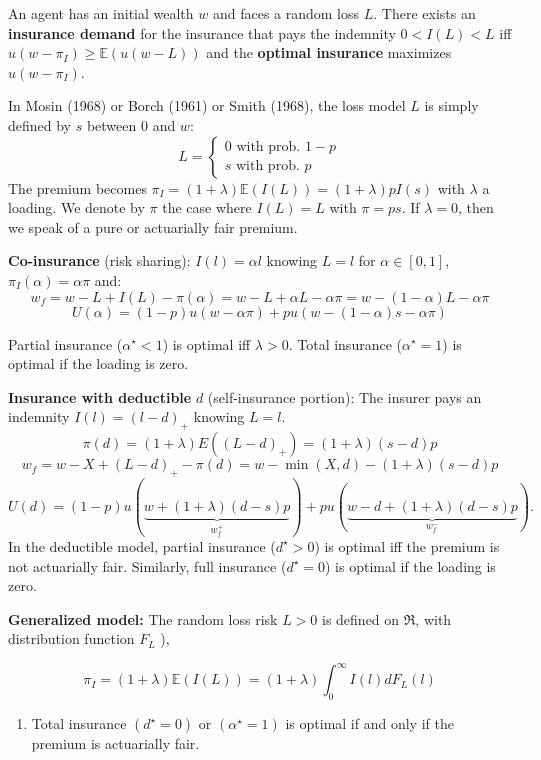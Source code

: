 \begin{f}
	
An agent has an initial wealth \(w\) and faces a random loss \(L\). There exists an \textbf{insurance demand} for the insurance that pays the indemnity \(0<I(L)<L\) iff \(u(w-\pi_I) \geq \mathbb{E}(u(w-L))\) and the \textbf{optimal insurance} maximizes \(u(w-\pi_I)\).

In Mosin (1968) or Borch (1961) or Smith (1968), the loss model \(L\) is simply defined by \(s\) between 0 and \(w\):
	\[
	L=\left\{\begin{array}{l}
		0 \text { with prob. } 1-p \\
		s \text { with prob. } p
	\end{array}\right.
	\]
The premium becomes \(\pi_I=(1+\lambda) \mathbb{E}(I(L))=(1+\lambda) p I(s)\) with \(\lambda\) a loading. We denote by \(\pi\) the case where \(I(L)=L\) with \(\pi= p s\). If \(\lambda=0\), then we speak of a pure or actuarially fair premium.
\medskip

\textbf{Co-insurance} (risk sharing):
\(I(l)=\alpha l\) knowing \(L=l\) for \(\alpha \in[0,1]\), \(\pi_I(\alpha)=\alpha \pi\) and:
\[
w_{f}=w-L+I(L)-\pi(\alpha)=w-L+\alpha L-\alpha \pi=w-(1-\alpha) L-\alpha \pi
\]
\[
U(\alpha)%
=(1-p) u(w-\alpha \pi)+p u(w-(1-\alpha) s-\alpha \pi)
\]

Partial insurance (\(\alpha^{\star}<1\)) is optimal iff \(\lambda>0\). Total insurance (\(\alpha^{\star}=1\)) is optimal if the loading is zero.
\medskip

\textbf{Insurance with deductible} \(d\) (self-insurance portion):
The insurer pays an indemnity \(I(l)=(l-d)_{+}\) knowing \(L=l\).
\[
\pi(d)=(1+\lambda) E\left((L-d)_{+}\right)=(1+\lambda)(s-d) p
\]
\[
w_{f}=w-X+(L-d)_{+}-\pi(d)=w-\min (X, d)-(1+\lambda)(s-d) p
\]
\[
U(d)=(1-p) u(\underbrace{w+(1+\lambda)(d-s) p}_{w_{f}^{+}})+p u(\underbrace{w-d+(1+\lambda)(d-s) p}_{w_{f}^{-}}) .
\]
In the deductible model, partial insurance (\(d^{\star}>0\)) is optimal iff the premium is not actuarially fair. Similarly, full insurance (\(d^{\star}=0\)) is optimal if the loading is zero.
\medskip

\textbf{Generalized model:}
The random loss risk \(L>0\) is defined on \(\Re\), with distribution function \(F_L\) ),

\[
\pi_I=(1+\lambda) \mathbb{E}(I(L))=(1+\lambda) \int_{0}^{\infty} I(l) d F_{L}(l)
\]



\begin{enumerate}
	\item Total insurance \((d^\star = 0)\) or \((\alpha^\star = 1)\) is optimal if and only if the premium is actuarially fair.
	

\end{enumerate}
\end{f}
